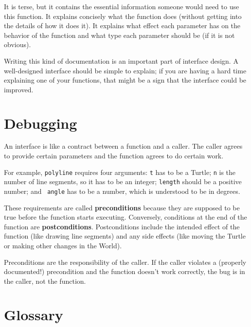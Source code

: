 \documentclass[10pt]{book}
\begin{document}
\begin{CJK}{UTF8}{gbsn}
It is terse, but it contains the essential information
someone would need to use this function.  It explains concisely what
the function does (without getting into the details of how it does
it).  It explains what effect each parameter has on the behavior of
the function and what type each parameter should be (if it is not
obvious).

Writing this kind of documentation is an important part of interface
design.  A well-designed interface should be simple to explain;
if you are having a hard time explaining one of your functions,
that might be a sign that the interface could be improved.


\section{Debugging}

An interface is like a contract between a function and a caller.
The caller agrees to provide certain parameters and the function
agrees to do certain work.

For example, {\tt polyline} requires four arguments: {\tt t} has to be
a Turtle; {\tt n} is the number of line segments, so it has to be an
integer; {\tt length} should be a positive number; and {\tt
  angle} has to be a number, which is understood to be in degrees.

These requirements are called {\bf preconditions} because they
are supposed to be true before the function starts executing.
Conversely, conditions at the end of the function are
{\bf postconditions}.  Postconditions include the intended
effect of the function (like drawing line segments) and any
side effects (like moving the Turtle or making other changes
in the World).

Preconditions are the responsibility of the caller.  If the caller
violates a (properly documented!) precondition and the function
doesn't work correctly, the bug is in the caller, not the function.



\section{Glossary}


\end{CJK}
\end{document}
